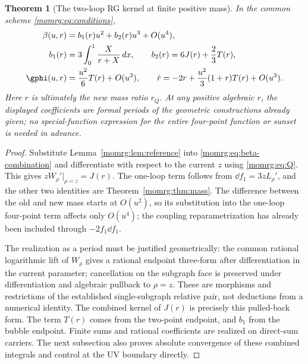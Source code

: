 \documentclass[11pt,a4paper,oneside]{article}
\theoremstyle{plain}
\newtheorem{theorem}{Theorem}[section]
\theoremstyle{definition}
\theoremstyle{remark}
\numberwithin{equation}{section}
\begin{document}
\begin{theorem}[The two-loop RG kernel at finite positive mass]\label{momrg:thm:beta}
In the common scheme \eqref{momrg:eq:conditions},
\begin{align}
 \beta(u,r)&=b_1(r)u^2+b_2(r)u^3+O(u^4),\label{momrg:eq:beta}\\
 b_1(r)&=3\int_0^1\frac{X}{r+X}\,dx,\qquad
 b_2(r)=6J(r)+\frac23T(r),\label{momrg:eq:b12}\\
 \gphi(u,r)&=\frac{u^2}{6}T(r)+O(u^3),\qquad
 \dot r=-2r+\frac{u^2}{3}(1+r)T(r)+O(u^3).
                                                        \label{momrg:eq:vector}
\end{align}
Here $r$ is ultimately the new mass ratio $r_Q$.
At any positive algebraic $r$, the displayed coefficients are formal periods of the geometric constructions already given;
no special-function expression for the entire four-point function or sunset is needed in advance.
\end{theorem}
\begin{proof}
Substitute Lemma~\ref{momrg:lem:reference} into \eqref{momrg:eq:beta-combination}
and differentiate with respect to the current $z$ using \eqref{momrg:eq:Q}. This gives
$zW_\rho'|_{\rho=z}=J(r)$.
The one-loop term follows from $\dd f_1=3zL_\rho'$, and the other two identities are Theorem~\ref{momrg:thm:mass}.
The difference between the old and new mass starts at $O(u^2)$,
so its substitution into the one-loop four-point term affects only $O(u^4)$;
the coupling reparametrization has already been included through $-2f_1\dd f_1$.

The realization as a period must be justified geometrically: the common rational logarithmic lift of $W_\rho$
gives a rational endpoint three-form after differentiation in the current parameter;
cancellation on the subgraph face is preserved under differentiation and algebraic pullback to $\rho=z$.
These are morphisms and restrictions of the established single-subgraph relative pair, not deductions from a numerical identity.
The combined kernel of $J(r)$ is precisely this pulled-back form.
The term $T(r)$ comes from the two-point endpoint, and $b_1$ from the bubble endpoint.
Finite sums and rational coefficients are realized on direct-sum carriers.
The next subsection also proves absolute convergence of these combined integrals and control at the UV boundary directly.
\end{proof}
\end{document}
